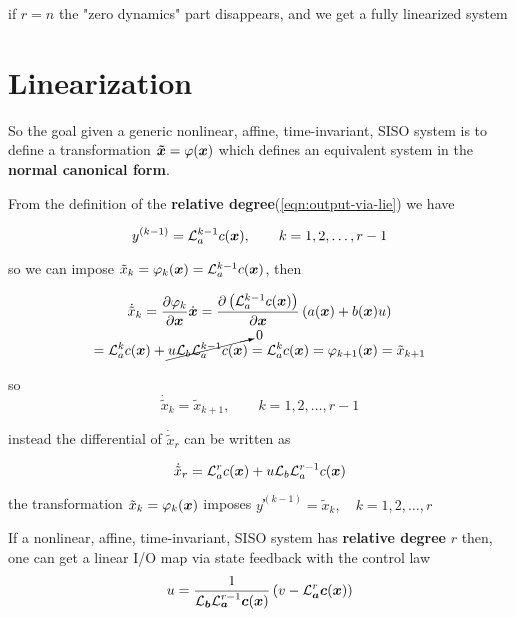 \begin{nb}if $r=n$ the "zero dynamics" part disappears, and we get a fully linearized system\end{nb}

\section{Linearization}

So the goal given a generic nonlinear, affine, time-invariant, SISO system is to define a transformation $\boldsymbol{\tilde x} = \varphi(\boldsymbol{x})$ which defines an equivalent system in the \textbf{normal canonical form}.

From the definition of the \textbf{relative degree}(\cref{eqn:output-via-lie}) we have

\[
    y^{(k-1)}=\mathcal{L}_{a}^{k-1} c(\boldsymbol{x}),\qquad k = 1,2,\dots, r-1
\]

so we can impose $\tilde x_k =\varphi_k(\boldsymbol{x}) = \mathcal{L}_{a}^{k-1} c(\boldsymbol{x})$, then

\begin{multline*}
    \dot{\tilde x}_k =
    \frac{\partial \varphi_k}{\partial \boldsymbol{x}} \dot{\boldsymbol{x}} =
    \frac{\partial \left( \mathcal{L}_{a}^{k-1} c(\boldsymbol{x}) \right)}{\partial \boldsymbol{x}} \left( a(\boldsymbol{x}) + b(\boldsymbol{x}) u \right) \\ =
    \mathcal{L}_{a}^k c(\boldsymbol{x}) + \cancelto{0}{u \mathcal{L}_{b}\mathcal{L}_{a}^{k-1} c(\boldsymbol{x})} =
    \mathcal{L}_{a}^k c(\boldsymbol{x}) =
    \varphi_{k+1}(\boldsymbol{x}) =
    \tilde x_{k+1}
\end{multline*}

so
\[
    \dot{\tilde x}_k = \tilde x_{k+1},\qquad k = 1,2,\dots, r-1
\]

instead the differential of $\dot{\tilde x}_r$ can be written as

\begin{equation}\label{eqn:newx-r}
    \dot{\tilde x}_r = \mathcal{L}_{a}^r c(\boldsymbol{x}) + u \mathcal{L}_{b}\mathcal{L}_{a}^{r-1} c(\boldsymbol{x})
\end{equation}

\begin{nb}the transformation $\tilde x_k =\varphi_k(\boldsymbol{x})$ imposes $y̛^{(k-1)} = \tilde x_k,\quad k = 1,2,\dots,r$\end{nb}

\begin{theorem}
If a nonlinear, affine, time-invariant, SISO system has \textbf{relative degree} $r$ then, one can get a linear I/O map via state feedback with the control law
    \[
        u = \frac{1}{\mathcal{L}_{\boldsymbol{b}} \mathcal{L}_{\boldsymbol{a}}^{r-1} \boldsymbol{c}(\boldsymbol{x})} \left( v - \mathcal{L}_{\boldsymbol{a}}^{r} \boldsymbol{c}(\boldsymbol{x}) \right)
    \]
\end{theorem}

